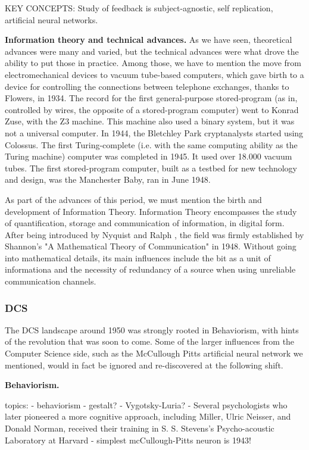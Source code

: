 \documentclass[../main.tex]{subfiles}
\begin{document}
KEY CONCEPTS: Study of feedback is subject-agnostic, self replication, artificial neural networks.

\vspace{4pt}
\textbf{Information theory and technical advances.} As we have seen, theoretical advances were many and varied, but the technical advances were what drove the ability to put those in practice. Among those, we have to mention the move from electromechanical devices to vacuum tube-based computers, which gave birth to a device for controlling the connections between telephone exchanges, thanks to Flowers, in 1934. The record for the first general-purpose stored-program (as in, controlled by wires, the opposite of a stored-program computer) went to Konrad Zuse, with the Z3 machine. This machine also used a binary system, but it was not a universal computer. In 1944, the Bletchley Park cryptanalysts started using Colossus. The first Turing-complete (i.e. with the same computing ability as the Turing machine) computer was completed in 1945. It used over 18.000 vacuum tubes. The first stored-program computer, built as a testbed for new technology and design, was the Manchester Baby, ran in June 1948\cite{}.

As part of the advances of this period, we must mention the birth and development of Information Theory. Information Theory encompasses the study of quantification, storage and communication of information, in digital form. After being introduced by Nyquist and Ralph \cite{}, the field was firmly established by Shannon's "A Mathematical Theory of Communication" in 1948. Without going into mathematical details, its main influences include the bit as a unit of informationa and the necessity of redundancy of a source when using unreliable communication channels.

\subsubsection{DCS}
The DCS landscape around 1950 was strongly rooted in Behaviorism, with hints of the revolution that was soon to come. Some of the larger influences from the Computer Science side, such as the McCullough Pitts artificial neural network we mentioned, would in fact be ignored and re-discovered at the following shift.

\vspace{4pt}
\textbf{Behaviorism.}


topics:
- behaviorism
- gestalt?
- Vygotsky-Luria?
- Several psychologists who later pioneered a more cognitive approach, including Miller, Ulric Neisser, and Donald Norman, received their training in S. S. Stevens’s Psycho-acoustic Laboratory at Harvard
- simplest mcCullough-Pitts neuron is 1943!
\end{document}
